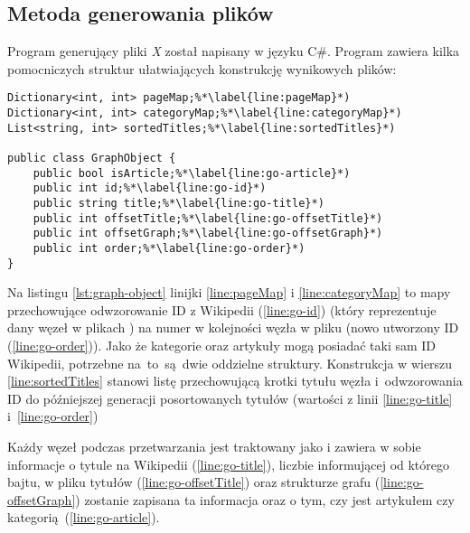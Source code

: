 

\subsection{Metoda generowania plików}

Program generujący pliki \textit{X} został napisany w języku C\#.
Program zawiera kilka pomocniczych struktur ułatwiających konstrukcję wynikowych plików:

\begin{lstlisting}[caption={Pomocnicze struktury dla programu generującego pliki dla aplikacji}, label=lst:graph-object]
Dictionary<int, int> pageMap;%*\label{line:pageMap}*)
Dictionary<int, int> categoryMap;%*\label{line:categoryMap}*)
List<string, int> sortedTitles;%*\label{line:sortedTitles}*)

public class GraphObject {
    public bool isArticle;%*\label{line:go-article}*)
    public int id;%*\label{line:go-id}*)
    public string title;%*\label{line:go-title}*)
    public int offsetTitle;%*\label{line:go-offsetTitle}*)
    public int offsetGraph;%*\label{line:go-offsetGraph}*)
    public int order;%*\label{line:go-order}*)
}
\end{lstlisting}

Na listingu \ref{lst:graph-object} linijki \ref{line:pageMap} i \ref{line:categoryMap} to mapy przechowujące odwzorowanie ID z Wikipedii (\ref{line:go-id}) (który reprezentuje dany węzeł w plikach ) na numer w kolejności węzła w pliku  (nowo utworzony ID (\ref{line:go-order})). Jako że kategorie oraz artykuły mogą posiadać taki sam ID Wikipedii, potrzebne na~to~są~dwie oddzielne struktury. Konstrukcja w wierszu \ref{line:sortedTitles} stanowi listę przechowującą krotki tytułu węzła i~odwzorowania ID do późniejszej generacji posortowanych tytułów (wartości z linii \ref{line:go-title} i~\ref{line:go-order})

Każdy węzeł podczas przetwarzania jest traktowany jako  i zawiera w sobie informacje o tytule na Wikipedii (\ref{line:go-title}), liczbie informującej od którego bajtu, w pliku tytułów  (\ref{line:go-offsetTitle}) oraz strukturze grafu  (\ref{line:go-offsetGraph}) zostanie zapisana ta informacja oraz o tym, czy jest artykułem czy kategorią~(\ref{line:go-article}).

